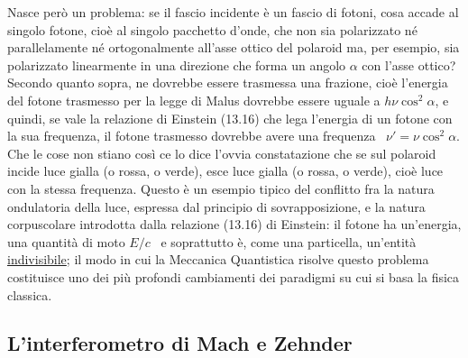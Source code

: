 Nasce per\`o un problema: se il fascio incidente \`e un fascio di fotoni, cosa
accade al singolo fotone, cio\`e al singolo pacchetto d'onde, che non sia
polarizzato n\'e parallelamente n\'e ortogonalmente all'asse ottico del polaroid
ma, per esempio, sia polarizzato linearmente in una direzione che forma un
angolo $\alpha$ con l'asse ottico? Secondo quanto sopra, ne dovrebbe essere
trasmessa una frazione, cio\`e l'energia del fotone trasmesso per la legge di
Malus dovrebbe essere uguale a $h\nu\cos^2\alpha$, e quindi, se vale la
relazione di Einstein (13.16) che lega l'energia di un fotone con la sua
frequenza, il fotone trasmesso dovrebbe avere una frequenza
\ $\nu'=\nu\cos^2\alpha$. Che le cose non stiano cos\`i ce lo dice l'ovvia
constatazione che se sul polaroid incide luce gialla (o rossa, o verde), esce
luce gialla (o rossa, o verde), cio\`e luce con la stessa frequenza. Questo \`e
un esempio tipico del conflitto fra la natura ondulatoria della luce, espressa
dal principio di sovrapposizione, e la natura corpuscolare introdotta dalla
relazione (13.16) di Einstein: il fotone ha un'energia, una quantit\`a di moto
$E/c$ \ e soprattutto \`e, come una particella, un'entit\`a
\underline{indivisibile}; il modo in cui la Meccanica Quantistica risolve questo
problema costituisce uno dei pi\`u profondi cambiamenti dei paradigmi su cui si
basa la fisica classica.

\subsection{L'interferometro di Mach e Zehnder}

